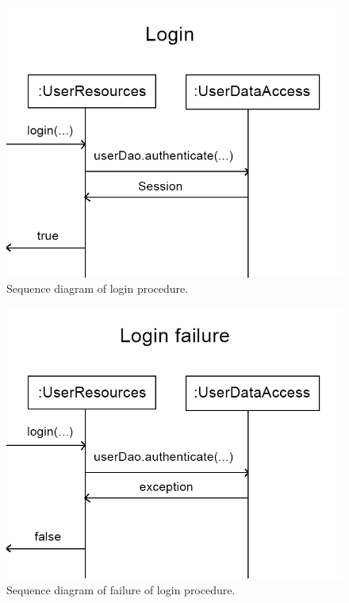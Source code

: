 \documentclass{article}
\begin{document}
\begin{figure}[h]
  \centering
  \includegraphics[scale=0.3]{seqdiagram1.png}
  \caption{Sequence diagram of login procedure.}
  \label{fig:seq1}
\end{figure}

\begin{figure}[h]
  \centering
  \includegraphics[scale=0.3]{seqdiagram2.png}
  \caption{Sequence diagram of failure of login procedure.}
  \label{fig:seq2}
\end{figure}
\end{document}
